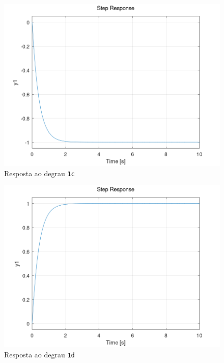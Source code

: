 \documentclass[a4paper,12pt]{article}
\begin{document}
    \begin{figure}[h]
        \centering
        \includegraphics[scale=0.4]{../fig/fig1c.png}
        \caption{Resposta ao degrau \texttt{1c}}
        \label{fig1c}
    \end{figure}
    \begin{figure}[h]
        \centering
        \includegraphics[scale=0.4]{../fig/fig1d.png}
        \caption{Resposta ao degrau \texttt{1d}}
        \label{fig1d}
    \end{figure}
\end{document}
